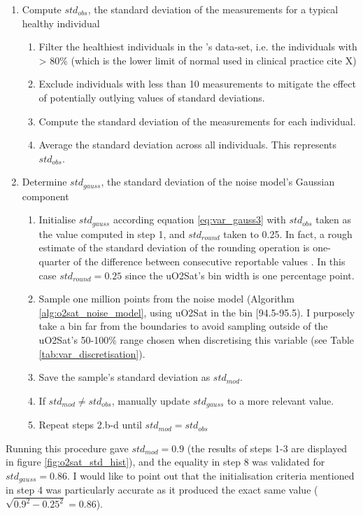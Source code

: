 \begin{enumerate}
    \item Compute $std_{obs}$, the standard deviation of the \OXSat measurements for a typical healthy individual
    \begin{enumerate}
        \item Filter the healthiest individuals in the \BR's data-set, i.e. the individuals with \FPrct > 80\% (which is the lower limit of normal used in clinical practice cite X)
        \item Exclude individuals with less than 10 \OXSat measurements to mitigate the effect of potentially outlying values of standard deviations.
        \item Compute the standard deviation of the \OXSat measurements for each individual. 
        \item Average the standard deviation across all individuals. This represents $std_{obs}$.
    \end{enumerate}
    \item Determine $std_{gauss}$, the standard deviation of the noise model's Gaussian component
    \begin{enumerate}
        \item Initialise $std_{gauss}$ according equation \ref{eq:var_gauss3} with $std_{obs}$ taken as the value computed in step 1, and $std_{round}$ taken to 0.25. In fact, a rough estimate of the standard deviation of the rounding operation is one-quarter of the difference between consecutive reportable values \cite{taylor_2017}. In this case $std_{round}=0.25$ since the uO2Sat's bin width is one percentage point.
        \item Sample one million points from the noise model (Algorithm \ref{alg:o2sat_noise_model}, using uO2Sat in the bin [94.5-95.5). I purposely take a bin far from the boundaries to avoid sampling outside of the uO2Sat's 50-100\% range chosen when discretising this variable (see Table \ref{tab:var_discretisation}). 
        \item Save the sample's standard deviation as $std_{mod}$. 
        \item If $std_{mod} \neq std_{obs}$, manually update $std_{gauss}$ to a more relevant value.
        \item Repeat steps 2.b-d until $std_{mod} = std_{obs}$
    \end{enumerate}
\end{enumerate}
Running this procedure gave $std_{mod}=0.9$ (the results of steps 1-3 are displayed in figure \ref{fig:o2sat_std_hist}), and the equality in step 8 was validated for $std_{gauss}=0.86$. I would like to point out that the initialisation criteria mentioned in step 4 was particularly accurate as it produced the exact same value ($\sqrt{0.9^2 - 0.25^2} = 0.86$).

